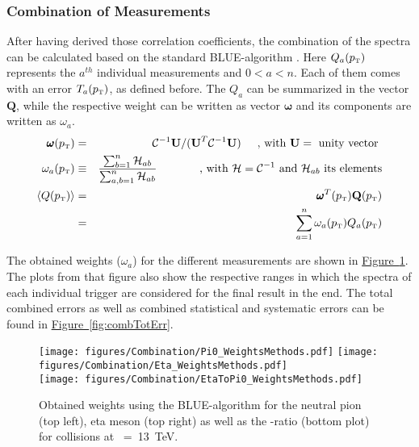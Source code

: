 \subsubsection{Combination of Measurements}
\label{sec:combMeasure}
 After having derived those correlation coefficients, the combination of the spectra can be calculated based on the standard \ac{BLUE}-algorithm \cite{Lyons1988rp,Valassi2003mu,Lyons1986em,barlow1989statistics,Valassi2013bga}. Here $Q_{a}(p_{\text{\tiny T}})$ represents the $a^{th}$ individual measurements and $0 < a < n$. Each of them comes with an error $T_a (p_{\text{\tiny T}})$, as defined before. The $Q_a$ can be summarized in the vector $\mathbf{Q}$, while the respective weight can be written as vector $\pmb{\omega}$ and its components are written as $\omega_{a}$.
 		\begin{eqnarray}
 			\pmb{\omega}(p_{\text{\tiny T}})		&=& \mathcal{C}^{-1}\textbf{U}/(\textbf{U}^{T}\mathcal{C}^{-1}\textbf{U}) \hspace{0.5cm}\text{, with } \textbf{U}= \text{ unity vector }\\
 			\omega_{a}(p_{\text{\tiny T}})					&\equiv& \frac{\sum_{b=1}^{n} \mathcal{H}_{ab}}{\sum_{a,b=1}^{n} \mathcal{H}_{ab}} \hspace{1.32cm} \text{, with } \mathcal{H} = \mathcal{C}^{-1} \text{ and } \mathcal{H}_{ab} \text{ its elements} \\
 			\langle Q (p_{\text{\tiny T}}) \rangle  &=& \pmb{\omega}^{T}(p_{\text{\tiny T}}) \mathbf{Q}(p_{\text{\tiny T}}) \\
 																							&=&	\sum_{a=1}^{n} \omega_{a}(p_{\text{\tiny T}}) Q_{a} (p_{\text{\tiny T}})
 		\end{eqnarray}

 The obtained weights ($\omega_{a}$) for the different measurements are shown in \hyperref[fig:Weights]{Figure~\ref*{fig:Weights}}. The plots from that figure also show the respective ranges in which the spectra of each individual trigger are considered for the final result in the end. The total combined errors as well as combined statistical and systematic errors can be found in \hyperref[fig:combTotErr]{Figure~\ref*{fig:combTotErr}}.
 		\begin{figure}[h]
 		\centering
 			\texttt{[image: figures/Combination/Pi0\_WeightsMethods.pdf]}
 			\texttt{[image: figures/Combination/Eta\_WeightsMethods.pdf]}\\
 			\texttt{[image: figures/Combination/EtaToPi0\_WeightsMethods.pdf]}
 			\caption{Obtained weights using the BLUE-algorithm for the neutral pion (top left), eta meson (top right) as well as the \EtaToPi-ratio (bottom plot) for \pp collisions at \s~=~13~TeV. }
 			\label{fig:Weights}
 		\end{figure}



